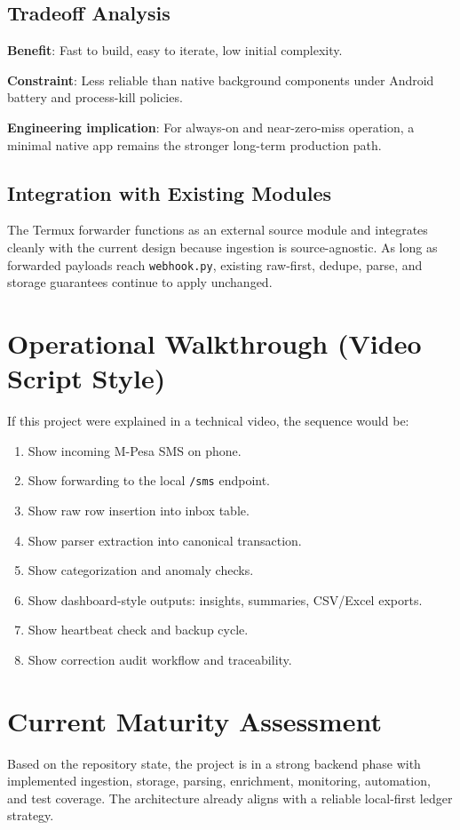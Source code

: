 \documentclass[12pt,a4paper]{article}
\begin{document}
\subsection{Tradeoff Analysis}
\textbf{Benefit}: Fast to build, easy to iterate, low initial complexity.

\textbf{Constraint}: Less reliable than native background components under Android battery and process-kill policies.

\textbf{Engineering implication}: For always-on and near-zero-miss operation, a minimal native app remains the stronger long-term production path.

\subsection{Integration with Existing Modules}
The Termux forwarder functions as an external source module and integrates cleanly with the current design because ingestion is source-agnostic. As long as forwarded payloads reach \texttt{webhook.py}, existing raw-first, dedupe, parse, and storage guarantees continue to apply unchanged.

\section{Operational Walkthrough (Video Script Style)}
If this project were explained in a technical video, the sequence would be:
\begin{enumerate}[leftmargin=1.5em]
  \item Show incoming M-Pesa SMS on phone.
  \item Show forwarding to the local \texttt{/sms} endpoint.
  \item Show raw row insertion into inbox table.
  \item Show parser extraction into canonical transaction.
  \item Show categorization and anomaly checks.
  \item Show dashboard-style outputs: insights, summaries, CSV/Excel exports.
  \item Show heartbeat check and backup cycle.
  \item Show correction audit workflow and traceability.
\end{enumerate}

\section{Current Maturity Assessment}
Based on the repository state, the project is in a strong backend phase with implemented ingestion, storage, parsing, enrichment, monitoring, automation, and test coverage. The architecture already aligns with a reliable local-first ledger strategy.
\end{document}
